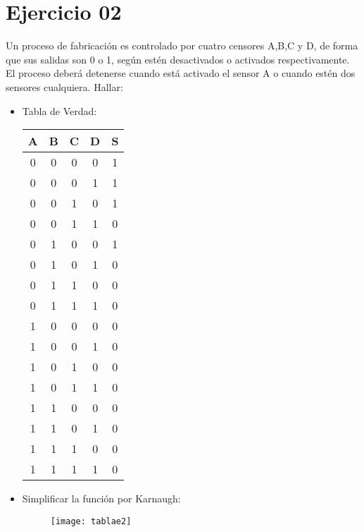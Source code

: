 \documentclass{article}
\begin{document}
        \section{\textbf{Ejercicio 02}}
            Un proceso de fabricación es controlado por cuatro censores A,B,C y D, de forma que sus salidas son 0 o 1, según estén desactivados o activados respectivamente. El proceso deberá detenerse cuando está activado el sensor A  o cuando estén dos sensores cualquiera. Hallar:\\    
            \begin{itemize}
            \item Tabla de Verdad:
                \begin{center}
                \renewcommand{\arraystretch}{1.5}
                \begin{tabular}{c c c c|c}
                A & B & C & D & S\\
                \hline
                0 & 0 & 0 & 0 & 1\\ 
                0 & 0 & 0 & 1 & 1\\ 
                0 & 0 & 1 & 0 & 1\\ 
                0 & 0 & 1 & 1 & 0\\ 
                0 & 1 & 0 & 0 & 1\\ 
                0 & 1 & 0 & 1 & 0\\ 
                0 & 1 & 1 & 0 & 0\\ 
                0 & 1 & 1 & 1 & 0\\ 
                1 & 0 & 0 & 0 & 0\\ 
                1 & 0 & 0 & 1 & 0\\ 
                1 & 0 & 1 & 0 & 0\\ 
                1 & 0 & 1 & 1 & 0\\ 
                1 & 1 & 0 & 0 & 0\\ 
                1 & 1 & 0 & 1 & 0\\ 
                1 & 1 & 1 & 0 & 0\\ 
                1 & 1 & 1 & 1 & 0\\
                \end{tabular}
                \end{center}
            \item Simplificar la función por Karnaugh:
                \begin{figure}[H]
                \centering
                \texttt{[image: tablae2]}

\end{figure}
\end{itemize}
\end{document}
